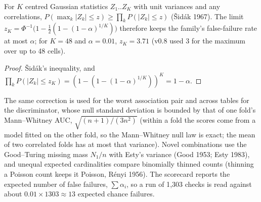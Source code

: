 \begin{proposition}\label{prop:sidak}
For $K$ centred Gaussian statistics $Z_1..Z_K$ with unit variances and any correlations, $P(\max_k|Z_k|\le z)\ge\prod_kP(|Z_k|\le z)$ (\v{S}id\'ak 1967). The limit $z_K=\Phi^{-1}\bigl(1-\frac12(1-(1-\alpha)^{1/K})\bigr)$ therefore keeps the family's false-failure rate at most $\alpha$; for $K=48$ and $\alpha=0.01$, $z_K=3.71$ (v0.8 used 3 for the maximum over up to 48 cells).
\end{proposition}
\begin{proof}
\v{S}id\'ak's inequality, and $\prod_kP(|Z_k|\le z_K)=(1-(1-(1-\alpha)^{1/K}))^K=1-\alpha$.
\end{proof}
\noindent The same correction is used for the worst association pair and across tables for the discriminator, whose null standard deviation is bounded by that of one fold's Mann--Whitney AUC, $\sqrt{(n+1)/(3n^2)}$ (within a fold the scores come from a model fitted on the other fold, so the Mann--Whitney null law is exact; the mean of two correlated folds has at most that variance). Novel combinations use the Good--Turing missing mass $N_1/n$ with Esty's variance (Good 1953; Esty 1983), and unequal expected cardinalities compare binomially thinned counts (thinning a Poisson count keeps it Poisson, R\'enyi 1956). The scorecard reports the expected number of false failures, $\sum\alpha_i$, so a run of 1{,}303 checks is read against about $0.01\times1303\approx13$ expected chance failures.
